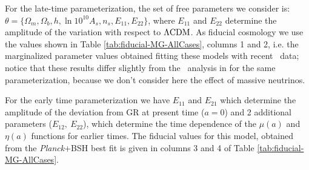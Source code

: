 For the late-time parameterization, the set of free parameters we
consider is: $\theta=\{\Omega_{m},\Omega_{b},h,\ln10^{10}A_{s},n_{s},E_{11},E_{22}\}$,
where $E_{11}$ and $E_{22}$ determine the amplitude of the variation
with respect to $\Lambda\mathrm{CDM}$. As fiducial cosmology we use the values
shown in Table \ref{tab:fiducial-MG-AllCases}, columns 1 and 2, i.e.
the marginalized parameter values obtained fitting these models with
recent \planck\ data; notice that these results differ slightly from
the \planck\ analysis in \cite{planck_collaboration_planck_2016-7} for
the same parameterization, because we don't consider here the effect
of massive neutrinos.

For the early time parameterization we have $E_{11}$ and $E_{21}$
which determine the amplitude of the deviation from GR at present
time ($a=0$) and 2 additional parameters ($E_{12},\ E_{22}$), which
determine the time dependence of the $\mu(a)$ and $\eta(a)$ functions
for earlier times. The
fiducial values for this model, obtained from the {\it Planck}+BSH best
fit is given in columns 3 and 4 of Table \ref{tab:fiducial-MG-AllCases}.

